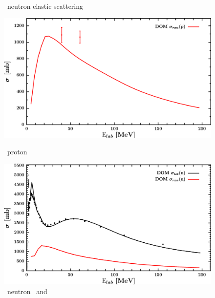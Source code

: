 \begin{figure}[hbtp]
\begin{minipage}{0.47\textwidth}
        \caption*{\niFour\ neutron elastic scattering}
        \label{DOMFitData_ni64_neutron_elastic}
    \end{minipage}
\end{figure}
\vspace{0.70in}
\begin{figure}[hbtp]
    \centering
    \begin{minipage}{0.47\textwidth}
        \centering
        \includegraphics[width=\linewidth]{figures/ni64_protonInelastic.png}
        \caption*{\niFour\ proton \rxn}
        \label{DOMFitData_ni64_proton_inelastic}
    \end{minipage}\hspace{6pt}
    \begin{minipage}{0.47\textwidth}
        \centering
        \includegraphics[width=\textwidth]{figures/ni64_neutronInelastic.png}
        \caption*{\niFour\ neutron \rxn\ and \tot}
        \label{DOMFitData_ni64_neutron_inelastic}
    \end{minipage}
\end{figure}
